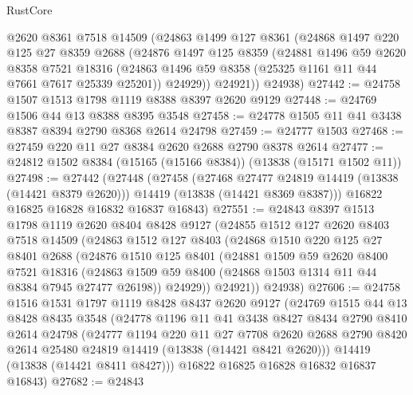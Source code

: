\begin{lexlean}{RustCore}
\begin{coremodule}
      @2620
      @8361
      @7518
      @14509
      (@24863
        @1499
        @127
        @8361
        (@24868
          @1497
          @220
          @125
          @27
          @8359
          @2688
          (@24876
            @1497
            @125
            @8359
            (@24881
              @1496
              @59
              @2620
              @8358
              @7521
              @18316
              (@24863 @1496 @59 @8358 (@25325 @1161 @11 @44 @7661 @7617 @25339 @25201))
              @24929))
          @24921))
      @24938)
@27442 := @24758 @1507 @1513 @1798 @1119 @8388 @8397 @2620 @9129
@27448 := @24769 @1506 @44 @13 @8388 @8395 @3548
@27458 := @24778 @1505 @11 @41 @3438 @8387 @8394 @2790 @8368 @2614 @24798
@27459 := @24777 @1503
@27468 := @27459 @220 @11 @27 @8384 @2620 @2688 @2790 @8378 @2614
@27477 := @24812 @1502 @8384 (@15165 (@15166 @8384)) (@13838 (@15171 @1502 @11))
@27498 := @27442
    (@27448
      (@27458
        (@27468 @27477 @24819 @14419 (@13838 (@14421 @8379 @2620)))
        @14419
        (@13838 (@14421 @8369 @8387)))
      @16822
      @16825
      @16828
      @16832
      @16837
      @16843)
@27551 := @24843
    @8397
    @1513
    @1798
    @1119
    @2620
    @8404
    @8428
    @9127
    (@24855
      @1512
      @127
      @2620
      @8403
      @7518
      @14509
      (@24863
        @1512
        @127
        @8403
        (@24868
          @1510
          @220
          @125
          @27
          @8401
          @2688
          (@24876
            @1510
            @125
            @8401
            (@24881
              @1509
              @59
              @2620
              @8400
              @7521
              @18316
              (@24863 @1509 @59 @8400 (@24868 @1503 @1314 @11 @44 @8384 @7945 @27477 @26198))
              @24929))
          @24921))
      @24938)
@27606 := @24758
    @1516
    @1531
    @1797
    @1119
    @8428
    @8437
    @2620
    @9127
    (@24769
      @1515
      @44
      @13
      @8428
      @8435
      @3548
      (@24778
        @1196
        @11
        @41
        @3438
        @8427
        @8434
        @2790
        @8410
        @2614
        @24798
        (@24777
          @1194
          @220
          @11
          @27
          @7708
          @2620
          @2688
          @2790
          @8420
          @2614
          @25480
          @24819
          @14419
          (@13838 (@14421 @8421 @2620)))
        @14419
        (@13838 (@14421 @8411 @8427)))
      @16822
      @16825
      @16828
      @16832
      @16837
      @16843)
@27682 := @24843

\end{coremodule}
\end{lexlean}
